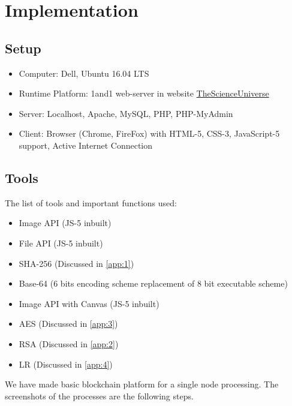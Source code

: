 \chapter{Implementation}
\label{ch:4}
\bigskip

\section{Setup}
\begin{itemize}
\item Computer: Dell, Ubuntu 16.04 LTS
\item Runtime Platform: 1and1 web-server in website \href{https://www.thescienceuniverse.com}{TheScienceUniverse}
\item Server: Localhost, Apache, MySQL, PHP, PHP-MyAdmin
\item Client: Browser (Chrome, FireFox) with HTML-5, CSS-3, JavaScript-5 support, Active Internet Connection
\end{itemize}

\section{Tools}
The list of tools and important functions used:
\begin{itemize}
\item Image API (JS-5 inbuilt)
\item File API (JS-5 inbuilt)
\item SHA-256 (Discussed in \ref{app:1})
\item Base-64 (6 bits encoding scheme replacement of 8 bit executable scheme)
\item Image API with Canvas (JS-5 inbuilt)
\item AES (Discussed in \ref{app:3})
\item RSA (Discussed in \ref{app:2})
\item LR (Discussed in \ref{app:4})
\end{itemize}

We have made basic blockchain platform for a single node processing. The screenshots of the processes are the following steps.
